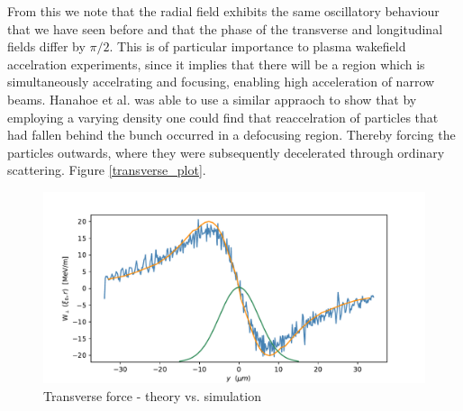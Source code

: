From this we note that the radial field exhibits the same oscillatory behaviour that we have seen before and that the phase of the transverse and longitudinal fields differ by $\pi/2$. This is of particular importance to plasma wakefield accelration experiments, since it implies that there will be a region which is simultaneously accelrating and focusing, enabling high acceleration of narrow beams. Hanahoe et al. was able to use a similar appraoch to show that by employing a varying density one could find that reaccelration of particles that had fallen behind the bunch occurred in a defocusing region. Thereby forcing the particles outwards, where they were subsequently decelerated through ordinary scattering. Figure \ref{transverse_plot}.\\
\begin{figure}
\centering
\includegraphics[width=\textwidth]{test.pdf}
\caption{Transverse force - theory vs. simulation}
\end{figure}


